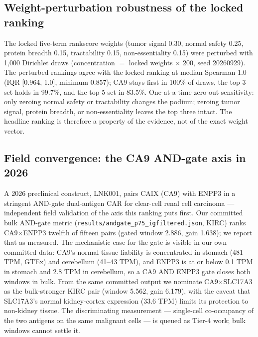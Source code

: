 \subsection{Weight-perturbation robustness of the locked ranking}
The locked five-term rankscore weights (tumor signal 0.30, normal safety 0.25,
protein breadth 0.15, tractability 0.15, non-essentiality 0.15) were perturbed
with 1{,}000 Dirichlet draws (concentration $=$ locked weights $\times$ 200, seed
20260929). The perturbed rankings agree with the locked ranking at median
Spearman 1.0 (IQR [0.964, 1.0], minimum 0.857); CA9 stays first in 100\% of
draws, the top-3 set holds in 99.7\%, and the top-5 set in 83.5\%. One-at-a-time
zero-out sensitivity: only zeroing normal safety or tractability changes the
podium; zeroing tumor signal, protein breadth, or non-essentiality leaves the
top three intact. The headline ranking is therefore a property of the evidence,
not of the exact weight vector.

\subsection{Field convergence: the CA9 AND-gate axis in 2026}
A 2026 preclinical construct, LNK001, pairs CAIX (CA9) with ENPP3 in a stringent
AND-gate dual-antigen CAR for clear-cell renal cell carcinoma --- independent
field validation of the axis this ranking puts first. Our committed bulk AND-gate
metric (\texttt{results/andgate\_p75\_igfiltered.json}, KIRC) ranks
CA9$\times$ENPP3 twelfth of fifteen pairs (gated window 2.886, gain 1.638); we
report that as measured. The mechanistic case for the gate is visible in our own
committed data: CA9's normal-tissue liability is concentrated in stomach (481
TPM, GTEx) and cerebellum (41--43 TPM), and ENPP3 is at or below 0.1 TPM in
stomach and 2.8 TPM in cerebellum, so a CA9 AND ENPP3 gate closes both windows
in bulk. From the same committed output we nominate CA9$\times$SLC17A3 as the
bulk-stronger KIRC pair (window 5.562, gain 6.179), with the caveat that
SLC17A3's normal kidney-cortex expression (33.6 TPM) limits its protection to
non-kidney tissue. The discriminating measurement --- single-cell co-occupancy
of the two antigens on the same malignant cells --- is queued as Tier-4 work;
bulk windows cannot settle it.
